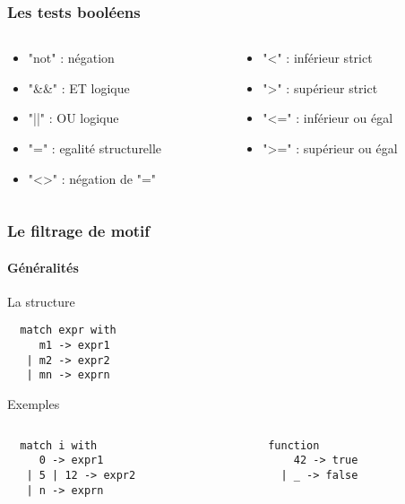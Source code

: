\begin{frame}[fragile]
    \frametitle{Les tests booléens}
	\begin{columns}
		\begin{column}{5cm}
			\begin{itemize}
				\item "not" : négation
				\item "\&\&" : ET logique
				\item "||" : OU logique
				\item "=" : egalité structurelle
				\item "<>" : négation de "="
			\end{itemize}
		\end{column}
		\begin{column}{5cm}
			\begin{itemize}
				\item "<" : inférieur strict
				\item ">" : supérieur strict
				\item "<=" : inférieur ou égal
				\item ">=" : supérieur ou égal
			\end{itemize}
		\end{column}
	\end{columns}
\end{frame}

\begin{frame}[fragile]
	\frametitle{Le filtrage de motif}
	\framesubtitle{Généralités}
	\begin{block}{La structure}
		\begin{lstlisting}
  match expr with
     m1 -> expr1
   | m2 -> expr2
   | mn -> exprn
		\end{lstlisting}
	\end{block}
	\begin{block}{Exemples}
		\begin{columns}
		\begin{column}{5cm}
		\begin{lstlisting}
  match i with
     0 -> expr1
   | 5 | 12 -> expr2
   | n -> exprn
		\end{lstlisting}
		\end{column}
		\begin{column}{5cm}
		\begin{lstlisting}
  function
      42 -> true
    | _ -> false
		\end{lstlisting}
		\end{column}
	\end{columns}
	\end{block}
\end{frame}

